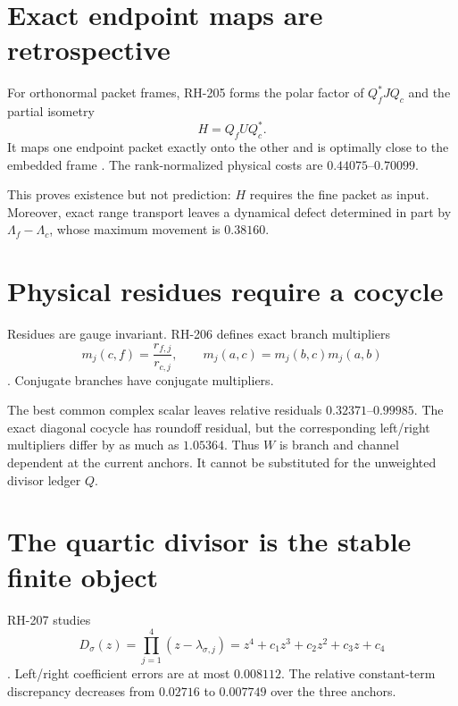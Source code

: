 \documentclass[12pt]{article}
\theoremstyle{remark}\newtheorem{remark}[theorem]{Remark}
\begin{document}
\section{Exact endpoint maps are retrospective}

For orthonormal packet frames, RH-205 forms the polar factor of
$Q_f^*JQ_c$ and the partial isometry
\begin{equation}\label{eq:procrustes}
 H=Q_fUQ_c^*.
\end{equation}
It maps one endpoint packet exactly onto the other and is optimally close to
the embedded frame \citep{WangRH205}.  The rank-normalized physical costs are
$0.44075$--$0.70099$.

This proves existence but not prediction: $H$ requires the fine packet as
input.  Moreover, exact range transport leaves a dynamical defect determined
in part by $\Lambda_f-\Lambda_c$, whose maximum movement is $0.38160$.

\section{Physical residues require a cocycle}

Residues are gauge invariant.  RH-206 defines exact branch multipliers
\begin{equation}\label{eq:cocycle}
 m_j(c,f)=\frac{r_{f,j}}{r_{c,j}},
 \qquad m_j(a,c)=m_j(b,c)m_j(a,b)
\end{equation}
\citep{WangRH206}.  Conjugate branches have conjugate multipliers.

The best common complex scalar leaves relative residuals
$0.32371$--$0.99985$.  The exact diagonal cocycle has roundoff residual, but
the corresponding left/right multipliers differ by as much as $1.05364$.
Thus $W$ is branch and channel dependent at the current anchors.  It cannot
be substituted for the unweighted divisor ledger $Q$.

\section{The quartic divisor is the stable finite object}

RH-207 studies
\begin{equation}\label{eq:quartic}
 D_\sigma(z)=\prod_{j=1}^4(z-\lambda_{\sigma,j})
 =z^4+c_1z^3+c_2z^2+c_3z+c_4
\end{equation}
\citep{WangRH207}.  Left/right coefficient errors are at most $0.008112$.
The relative constant-term discrepancy decreases from $0.02716$ to
$0.007749$ over the three anchors.
\end{document}
